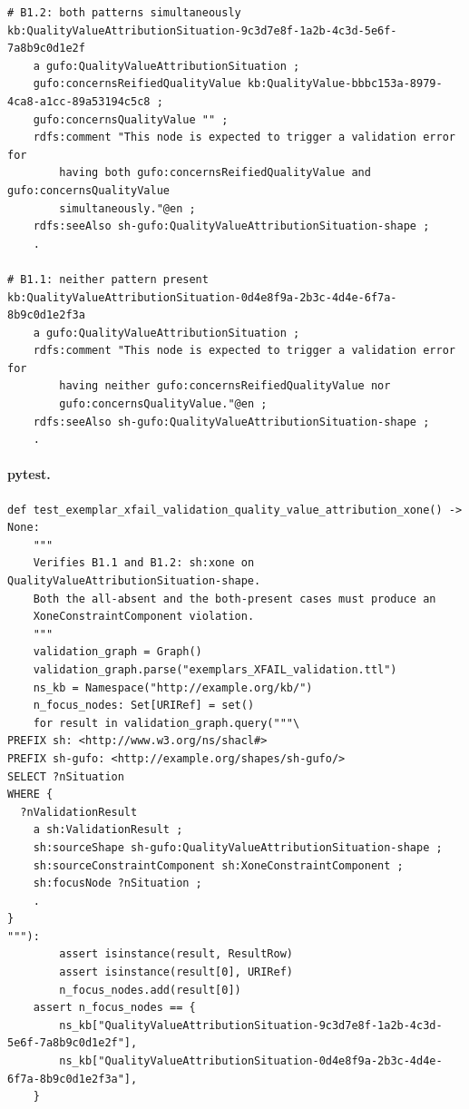\documentclass[12pt,a4paper]{article}
\begin{document}
\begin{lstlisting}[style=turtlestyle]
# B1.2: both patterns simultaneously
kb:QualityValueAttributionSituation-9c3d7e8f-1a2b-4c3d-5e6f-7a8b9c0d1e2f
    a gufo:QualityValueAttributionSituation ;
    gufo:concernsReifiedQualityValue kb:QualityValue-bbbc153a-8979-4ca8-a1cc-89a53194c5c8 ;
    gufo:concernsQualityValue "" ;
    rdfs:comment "This node is expected to trigger a validation error for
        having both gufo:concernsReifiedQualityValue and gufo:concernsQualityValue
        simultaneously."@en ;
    rdfs:seeAlso sh-gufo:QualityValueAttributionSituation-shape ;
    .

# B1.1: neither pattern present
kb:QualityValueAttributionSituation-0d4e8f9a-2b3c-4d4e-6f7a-8b9c0d1e2f3a
    a gufo:QualityValueAttributionSituation ;
    rdfs:comment "This node is expected to trigger a validation error for
        having neither gufo:concernsReifiedQualityValue nor
        gufo:concernsQualityValue."@en ;
    rdfs:seeAlso sh-gufo:QualityValueAttributionSituation-shape ;
    .
\end{lstlisting}

\paragraph{pytest.}

\begin{lstlisting}[style=pythonstyle]
def test_exemplar_xfail_validation_quality_value_attribution_xone() -> None:
    """
    Verifies B1.1 and B1.2: sh:xone on QualityValueAttributionSituation-shape.
    Both the all-absent and the both-present cases must produce an
    XoneConstraintComponent violation.
    """
    validation_graph = Graph()
    validation_graph.parse("exemplars_XFAIL_validation.ttl")
    ns_kb = Namespace("http://example.org/kb/")
    n_focus_nodes: Set[URIRef] = set()
    for result in validation_graph.query("""\
PREFIX sh: <http://www.w3.org/ns/shacl#>
PREFIX sh-gufo: <http://example.org/shapes/sh-gufo/>
SELECT ?nSituation
WHERE {
  ?nValidationResult
    a sh:ValidationResult ;
    sh:sourceShape sh-gufo:QualityValueAttributionSituation-shape ;
    sh:sourceConstraintComponent sh:XoneConstraintComponent ;
    sh:focusNode ?nSituation ;
    .
}
"""):
        assert isinstance(result, ResultRow)
        assert isinstance(result[0], URIRef)
        n_focus_nodes.add(result[0])
    assert n_focus_nodes == {
        ns_kb["QualityValueAttributionSituation-9c3d7e8f-1a2b-4c3d-5e6f-7a8b9c0d1e2f"],
        ns_kb["QualityValueAttributionSituation-0d4e8f9a-2b3c-4d4e-6f7a-8b9c0d1e2f3a"],
    }
\end{lstlisting}
\end{document}
